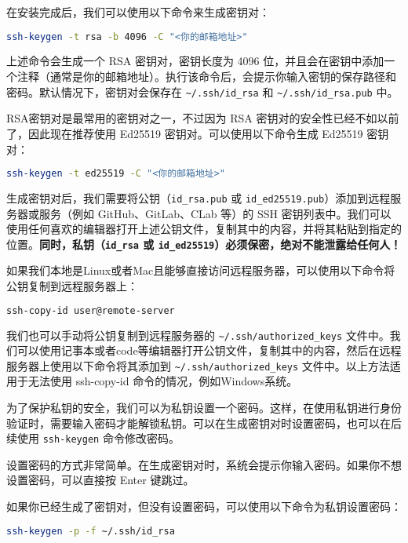 在安装完成后，我们可以使用以下命令来生成密钥对：
\begin{lstlisting}[language=bash]
ssh-keygen -t rsa -b 4096 -C "<你的邮箱地址>"
\end{lstlisting}

上述命令会生成一个 RSA 密钥对，密钥长度为 4096 位，并且会在密钥中添加一个注释（通常是你的邮箱地址）。执行该命令后，会提示你输入密钥的保存路径和密码。默认情况下，密钥对会保存在 \texttt{\textasciitilde/.ssh/id\_rsa} 和 \texttt{\textasciitilde/.ssh/id\_rsa.pub} 中。

RSA密钥对是最常用的密钥对之一，不过因为 RSA 密钥对的安全性已经不如以前了，因此现在推荐使用 Ed25519 密钥对。可以使用以下命令生成 Ed25519 密钥对：
\begin{lstlisting}[language=bash]
ssh-keygen -t ed25519 -C "<你的邮箱地址>"
\end{lstlisting}

生成密钥对后，我们需要将公钥（\texttt{id\_rsa.pub} 或 \texttt{id\_ed25519.pub}）添加到远程服务器或服务（例如 GitHub、GitLab、CLab 等）的 SSH 密钥列表中。我们可以使用任何喜欢的编辑器打开上述公钥文件，复制其中的内容，并将其粘贴到指定的位置。\textbf{\color{red}同时，私钥（\texttt{id\_rsa} 或 \texttt{id\_ed25519}）必须保密，绝对不能泄露给任何人！}

如果我们本地是Linux或者Mac且能够直接访问远程服务器，可以使用以下命令将公钥复制到远程服务器上：
\begin{lstlisting}[language=bash]
ssh-copy-id user@remote-server
\end{lstlisting}

我们也可以手动将公钥复制到远程服务器的 \texttt{\textasciitilde/.ssh/authorized\_keys} 文件中。我们可以使用记事本或者code等编辑器打开公钥文件，复制其中的内容，然后在远程服务器上使用以下命令将其添加到 \texttt{\textasciitilde/.ssh/authorized\_keys} 文件中。以上方法适用于无法使用 ssh-copy-id 命令的情况，例如Windows系统。

为了保护私钥的安全，我们可以为私钥设置一个密码。这样，在使用私钥进行身份验证时，需要输入密码才能解锁私钥。可以在生成密钥对时设置密码，也可以在后续使用 \texttt{ssh-keygen} 命令修改密码。

设置密码的方式非常简单。在生成密钥对时，系统会提示你输入密码。如果你不想设置密码，可以直接按 Enter 键跳过。

如果你已经生成了密钥对，但没有设置密码，可以使用以下命令为私钥设置密码：
\begin{lstlisting}[language=bash]
ssh-keygen -p -f ~/.ssh/id_rsa
\end{lstlisting}

